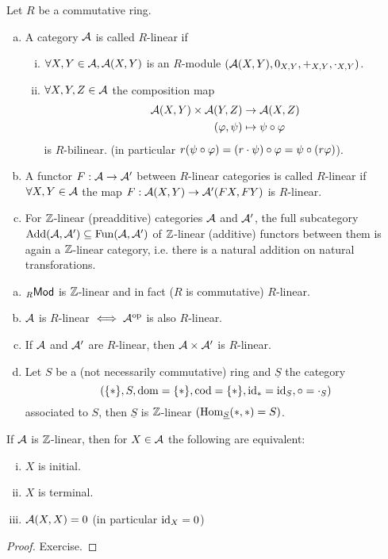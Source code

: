\documentclass[a4paper]{report}
\begin{document}
\begin{defi}
  Let $R$ be a commutative ring.
  \begin{enumerate}[(a)]
    \item A category $\mathcal{A}$ is called $R$-linear if
          \begin{enumerate}[(i)]
            \item $\forall X, Y \in \mathcal{A}, \mathcal{A}(X,Y)$ is an $R$-module $(\mathcal{A}(X,Y), 0_{X,Y}, +_{X,Y}, \cdot_{X,Y})$.
                  \item $\forall X, Y, Z \in \mathcal{A}$ the composition map \begin{align*}
                    \mathcal{A}(X,Y) \times \mathcal{A}(Y,Z) & \to \mathcal{A}(X,Z) \\
                    (\varphi, \psi) &\mapsto \psi \circ \varphi
                  \end{align*}
                  is $R$-bilinear. (in particular $r(\psi \circ \varphi) = (r \cdot \psi) \circ \varphi = \psi \circ(r \varphi)$).
          \end{enumerate}
    \item A functor $F: \mathcal{A} \to \mathcal{A}'$ between $R$-linear categories is called $R$-linear if $\forall X, Y \in \mathcal{A}$ the map $F: \mathcal{A}(X,Y) \to \mathcal{A}'(FX,FY)$ is $R$-linear.
          \item For $\mathbb{Z}$-linear (preadditive) categories $\mathcal{A}$ and $\mathcal{A}'$, the full subcategory $\operatorname{Add}(\mathcal{A},\mathcal{A}') \subseteq \operatorname{Fun}(\mathcal{A},\mathcal{A}')$ of $\mathbb{Z}$-linear (additive) functors between them is again a $\mathbb{Z}$-linear category, i.e. there is a natural addition on natural transforations.
  \end{enumerate}
\end{defi}

\begin{exmps*}
\begin{enumerate}[(a)]
  \item ${}_R\mathsf{Mod}$ is $\mathbb{Z}$-linear and in fact ($R$ is commutative) $R$-linear.
  \item $\mathcal{A}$ is $R$-linear $\iff \mathcal{A}^\mathrm{op}$ is also $R$-linear.
  \item If $\mathcal{A}$ and $\mathcal{A}'$ are $R$-linear, then $\mathcal{A} \times \mathcal{A}'$ is $R$-linear.
        \item Let $S$ be a (not necessarily commutative) ring and $\underline S$ the category \[(\{*\}, S, \operatorname{dom} = \{*\}, \operatorname{cod} = \{*\}, \operatorname{id}_{*} = \operatorname{id}_{S}, \circ = \cdot_{S})\] associated to $S$, then $\underline S$ is $\mathbb{Z}$-linear $(\operatorname{Hom}_{\underline S}(*,*) = S)$.
\end{enumerate}
\end{exmps*}

\begin{lemm}
  If $\mathcal{A}$ is $\mathbb{Z}$-linear, then for $X \in \mathcal{A}$ the following are equivalent:
  \begin{enumerate}[(i)]
\item $X$ is initial.
    \item $X$ is terminal.
          \item $\mathcal{A}(X,X)=0$ (in particular $\operatorname{id}_{X} = 0$)
  \end{enumerate}
\begin{proof}
Exercise.
\end{proof}
\end{lemm}
\end{document}
